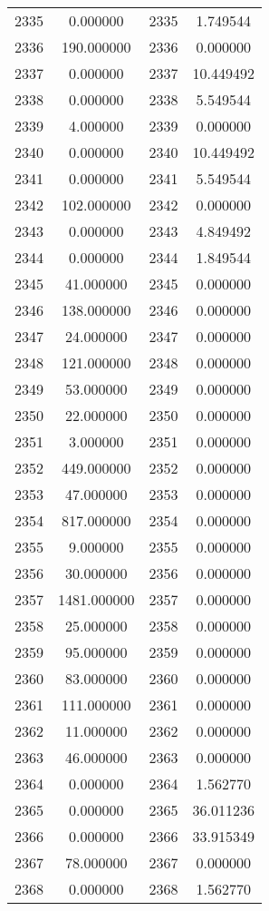 \documentclass[12pt]{article}
\begin{document}
\begin{longtable}{@{}cccc@{}}
2335 & 0.000000 & 2335 & 1.749544 \\
2336 & 190.000000 & 2336 & 0.000000 \\
2337 & 0.000000 & 2337 & 10.449492 \\
2338 & 0.000000 & 2338 & 5.549544 \\
2339 & 4.000000 & 2339 & 0.000000 \\
2340 & 0.000000 & 2340 & 10.449492 \\
2341 & 0.000000 & 2341 & 5.549544 \\
2342 & 102.000000 & 2342 & 0.000000 \\
2343 & 0.000000 & 2343 & 4.849492 \\
2344 & 0.000000 & 2344 & 1.849544 \\
2345 & 41.000000 & 2345 & 0.000000 \\
2346 & 138.000000 & 2346 & 0.000000 \\
2347 & 24.000000 & 2347 & 0.000000 \\
2348 & 121.000000 & 2348 & 0.000000 \\
2349 & 53.000000 & 2349 & 0.000000 \\
2350 & 22.000000 & 2350 & 0.000000 \\
2351 & 3.000000 & 2351 & 0.000000 \\
2352 & 449.000000 & 2352 & 0.000000 \\
2353 & 47.000000 & 2353 & 0.000000 \\
2354 & 817.000000 & 2354 & 0.000000 \\
2355 & 9.000000 & 2355 & 0.000000 \\
2356 & 30.000000 & 2356 & 0.000000 \\
2357 & 1481.000000 & 2357 & 0.000000 \\
2358 & 25.000000 & 2358 & 0.000000 \\
2359 & 95.000000 & 2359 & 0.000000 \\
2360 & 83.000000 & 2360 & 0.000000 \\
2361 & 111.000000 & 2361 & 0.000000 \\
2362 & 11.000000 & 2362 & 0.000000 \\
2363 & 46.000000 & 2363 & 0.000000 \\
2364 & 0.000000 & 2364 & 1.562770 \\
2365 & 0.000000 & 2365 & 36.011236 \\
2366 & 0.000000 & 2366 & 33.915349 \\
2367 & 78.000000 & 2367 & 0.000000 \\
2368 & 0.000000 & 2368 & 1.562770 \\

\end{longtable}
\end{document}
